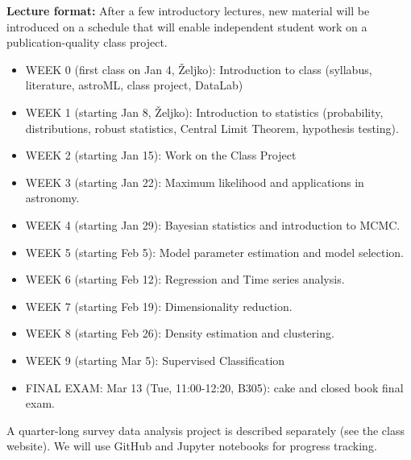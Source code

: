 \documentclass[10pt]{article}
\begin{document}
\vskip 0.2in
{\bf Lecture format:}
After a few introductory lectures, new material will be introduced on a schedule that 
will enable independent student work on a publication-quality class project. 

\newpage 
\begin{itemize}

\item WEEK 0 (first class on Jan 4, \v{Zeljko}): Introduction to class (syllabus, literature, astroML, class project, DataLab) 

\item WEEK 1 (starting Jan 8, \v{Zeljko}): Introduction to statistics (probability, distributions, 
                         robust statistics, Central Limit Theorem, hypothesis testing).

\item WEEK  2 (starting Jan 15): Work on the Class Project

\item WEEK  3 (starting Jan 22): Maximum likelihood and applications in astronomy.

\item WEEK  4 (starting Jan 29): Bayesian statistics and introduction to MCMC.

\item WEEK  5 (starting Feb 5): Model parameter estimation and model selection.

\item WEEK  6 (starting Feb 12): Regression and Time series analysis.

\item WEEK  7 (starting Feb 19): Dimensionality reduction. 

\item WEEK  8 (starting Feb 26): Density estimation and clustering.

\item WEEK  9 (starting Mar 5): Supervised Classification 

\item FINAL EXAM: Mar 13 (Tue, 11:00-12:20, B305): cake and closed book final exam.

\end{itemize}

\vskip 0.2in


A quarter-long survey data analysis project is described separately (see the class website). 
We will use GitHub and Jupyter notebooks for progress tracking. 
\end{document}
